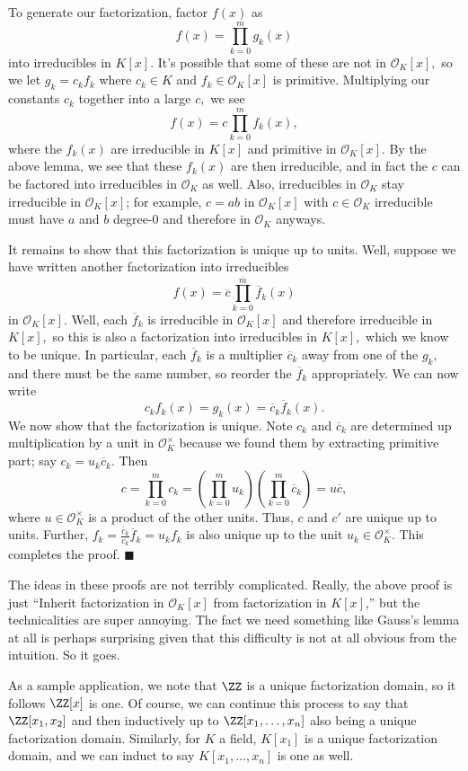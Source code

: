 To generate our factorization, factor $f(x)$ as
\[f(x)=\prod_{k=0}^mg_k(x)\]
into irreducibles in $K[x].$ It's possible that some of these are not in $\mathcal O_K[x],$ so we let $g_k=c_kf_k$ where $c_k\in K$ and $f_k\in\mathcal O_K[x]$ is primitive. Multiplying our constants $c_k$ together into a large $c,$ we see
\[f(x)=c\prod_{k=0}^mf_k(x),\]
where the $f_k(x)$ are irreducible in $K[x]$ and primitive in $\mathcal O_K[x].$ By the above lemma, we see that these $f_k(x)$ are then irreducible, and in fact the $c$ can be factored into irreducibles in $\mathcal O_K$ as well. Also, irreducibles in $\mathcal O_K$ stay irreducible in $\mathcal O_K[x]$; for example, $c=ab$ in $\mathcal O_K[x]$ with $c\in\mathcal O_K$ irreducible must have $a$ and $b$ degree-$0$ and therefore in $\mathcal O_K$ anyways.

It remains to show that this factorization is unique up to units. Well, suppose we have written another factorization into irreducibles
\[f(x)=\overline c\prod_{k=0}^{\overline m}\overline f_k(x)\]
in $\mathcal O_K[x].$ Well, each $\overline f_k$ is irreducible in $\mathcal O_K[x]$ and therefore irreducible in $K[x],$ so this is also a factorization into irreducibles in $K[x],$ which we know to be unique. In particular, each $\overline f_k$ is a multiplier $\overline c_k$ away from one of the $g_k,$ and there must be the same number, so reorder the $\overline f_k$ appropriately. We can now write
\[c_kf_k(x)=g_k(x)=\overline c_k\overline f_k(x).\]
We now show that the factorization is unique. Note $c_k$ and $\overline c_k$ are determined up multiplication by a unit in $\mathcal O_K^\times$ because we found them by extracting primitive part; say $c_k=u_k\overline c_k.$ Then
\[c=\prod_{k=0}^mc_k=\left(\prod_{k=0}^mu_k\right)\left(\prod_{k=0}^m\overline c_k\right)=u\overline c,\]
where $u\in\mathcal O_K^\times$ is a product of the other units. Thus, $c$ and $c'$ are unique up to units. Further, $f_k=\frac{\overline c_k}{c_k}\overline f_k=u_kf_k$ is also unique up to the unit $u_k\in\mathcal O_K^\times.$ This completes the proof. $\blacksquare$

The ideas in these proofs are not terribly complicated. Really, the above proof is just ``Inherit factorization in $\mathcal O_K[x]$ from factorization in $K[x]$,'' but the technicalities are super annoying. The fact we need something like Gauss's lemma at all is perhaps surprising given that this difficulty is not at all obvious from the intuition. So it goes.

As a sample application, we note that $\ZZ$ is a unique factorization domain, so it follows $\ZZ[x]$ is one. Of course, we can continue this process to say that $\ZZ[x_1,x_2]$ and then inductively up to $\ZZ[x_1,\ldots,x_n]$ also being a unique factorization domain. Similarly, for $K$ a field, $K[x_1]$ is a unique factorization domain, and we can induct to say $K[x_1,\ldots,x_n]$ is one as well.
